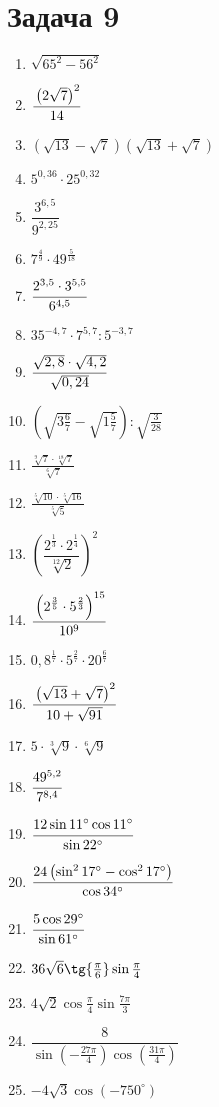 \chapter{Задача 9}	
	\begin{enumerate}
	\item $\sqrt{65^2 - 56^2}$
	\item $\cfrac{\left( 2\sqrt{7}\right)^2 }{14}$
	\item $\left(\sqrt{13} - \sqrt{7} \right) \left( \sqrt{13} + \sqrt{7}\right) $
	\item $5^{0,36} \cdot 25^{0,32}$
	\item $\dfrac{3^{6,5}}{9^{2,25}}$
	
	\item $7^{\frac{4}{9}} \cdot 49^{\frac{5}{18}}$
	\item $\cfrac{2^{3,5} \cdot 3^{5,5}}{6^{4,5}}$
	\item $35^{-4,7} \cdot 7^{5,7} : 5^{-3,7}$
	\item $\cfrac{\sqrt{2,8} \cdot \sqrt{4,2}}{\sqrt{0,24}}$
	\item $\left( \sqrt{3\frac{6}{7}} - \sqrt{1\frac{5}{7}}\right) : \sqrt{\frac{3}{28}}$ 
		
	\item $\frac{\sqrt[9]{7} \cdot \sqrt[18]{7}}{\sqrt[6]{7}}$	
	\item $\frac{\sqrt[5]{10} \cdot \sqrt[5]{16}}{\sqrt[5]{5}}$
	\item $\left( \dfrac{2^{\frac{1}{3}} \cdot 2^{\frac{1}{4}}}{\sqrt[12]{2}}\right)^2 $
	\item $\cfrac{\left( 2^{\frac{3}{5}} \cdot 5^{\frac{2}{3}}\right)^{15} }{10^9}$	
	\item $0,8^{\frac{1}{7}} \cdot 5^{\frac{2}{7}} \cdot 20^{\frac{6}{7}}$
	
	\item $\cfrac{\left(\sqrt{13} + \sqrt{7} \right)^2}{10 +\sqrt{91}}$
	\item $5 \cdot \sqrt[3]{9} \cdot \sqrt[6]{9}$
	\item $\cfrac{49^{5,2}}{7^{8,4}}$
	\item $\cfrac{12 \sin{11^{\circ}} \cos{11^{\circ}}}{\sin{22^{\circ}}}$
	\item $\cfrac{24\left( \sin^{2}{17^{\circ}} - \cos^{2}{17^{\circ}}\right) }{\cos{34^{\circ}}}$
	
	\item $\cfrac{5\cos{29^{\circ}}}{\sin{61^{\circ}}}$
	\item $36\sqrt{6}\tg{\frac{\pi}{6}}\sin{\frac{\pi}{4}}$
	\item $4\sqrt{2}\cos{\frac{\pi}{4}}\sin{\frac{7\pi}{3}}$
	\item $\dfrac{8}{\sin{\left( -\frac{27\pi}{4}\right) }\cos{\left( \frac{31\pi}{4}\right) }}$
	\item $-4\sqrt{3} \cos{\left( -750^{\circ}\right) }$
	

\end{enumerate}
